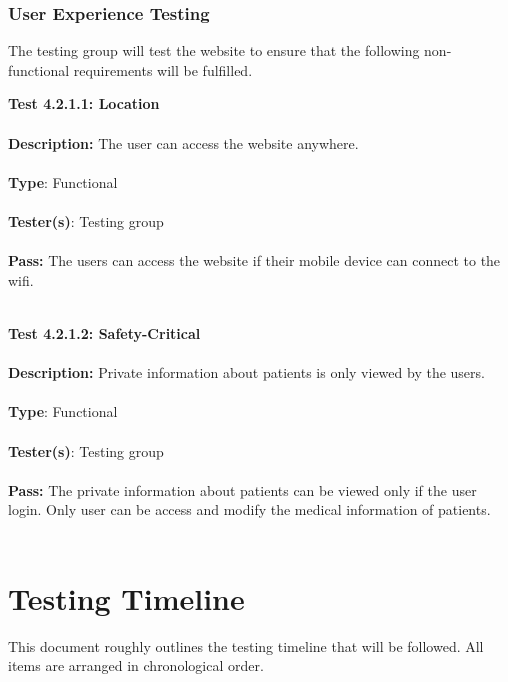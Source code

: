 \documentclass[12pt]{article}
\begin{document}
\subsubsection{User Experience Testing}
The testing group will test the website to ensure that the following non-functional requirements will be fulfilled.

\begin{tcolorbox}
\textbf{Test 4.2.1.1: Location} \\ \\
\textbf{Description:} The user can access the website anywhere. \\ \\
\textbf{Type}: Functional  \\ \\
\textbf{Tester(s)}: Testing group \\ \\
\textbf{Pass:} The users can access the website if their mobile device can connect to the wifi. \\ \\
\end{tcolorbox}

\begin{tcolorbox}
\textbf{Test 4.2.1.2: Safety-Critical } \\ \\
\textbf{Description:} Private information about patients is only viewed by the users. \\ \\
\textbf{Type}: Functional  \\ \\
\textbf{Tester(s)}: Testing group \\ \\
\textbf{Pass:} The private information about patients can be viewed only if the user login. Only user can be access and modify the medical information of patients. \\ \\
\end{tcolorbox}

\newpage

\section{Testing Timeline}
This document roughly outlines the testing timeline that will be followed. All items are arranged in chronological order.
\end{document}
